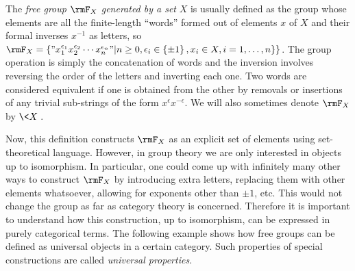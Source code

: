 \begin{defn}
    The \emph{free group} $\rmF_{X}$ \emph{generated by a set} $X$
    is usually defined as the group whose elements are all the finite-length
    ``words'' formed out of elements $x$ of $X$ and their formal inverses
    $x^{-1}$ as letters, so $\rmF_{X}=\left\{ "x_{1}^{\epsilon_{1}}x_{2}^{\epsilon_{2}}\cdots x_{n}^{\epsilon_{n}}"|n\geq0,\epsilon_{i}\in\left\{ \pm1\right\} ,x_{i}\in X,i=1,\ldots,n\}\right\} $.
    The group operation is simply the concatenation of words and the inversion
    involves reversing the order of the letters and inverting each one. Two words are considered equivalent if one is obtained from the other by removals or insertions of any trivial sub-strings of the form $x^{\epsilon}x^{-\epsilon}$. We will also sometimes denote $\rmF_X$ by $\<X\>$.
\end{defn}
Now, this definition constructs $\rmF_{X}$ as an explicit set of elements
using set-theoretical language. However, in group theory we are only
interested in objects up to isomorphism. In particular, one could
come up with infinitely many other ways to construct $\rmF_{X}$ by introducing
extra letters, replacing them with other elements whatsoever, allowing for exponents other than $\pm 1$, etc. This
would not change the group as far as category theory is concerned.
Therefore it is important to understand how this construction, up
to isomorphism, can be expressed in purely categorical terms. The
following example shows how free groups can be defined as universal
objects in a certain category. Such properties of special constructions
are called \emph{universal properties}.
